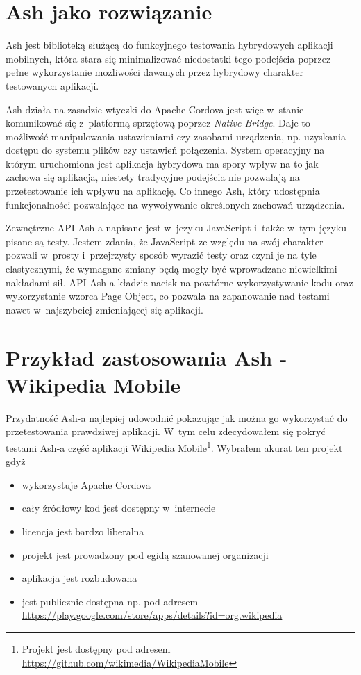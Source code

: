 \documentclass[brudnopis]{xmgr}
\begin{document}
                                                                                                                                                                 
\section{Ash jako rozwiązanie}

Ash jest biblioteką służącą do funkcyjnego testowania hybrydowych aplikacji mobilnych, która stara się minimalizować niedostatki tego podejścia poprzez pełne wykorzystanie możliwości dawanych przez hybrydowy charakter testowanych aplikacji. 

Ash działa na zasadzie wtyczki do Apache Cordova jest więc w~stanie komunikować się z~platformą sprzętową poprzez \textit{Native Bridge}. Daje to możliwość manipulowania ustawieniami czy zasobami urządzenia, np. uzyskania dostępu do systemu plików czy ustawień połączenia. System operacyjny na którym uruchomiona jest aplikacja hybrydowa ma spory wpływ na to jak zachowa się aplikacja, niestety tradycyjne podejścia nie pozwalają na przetestowanie ich wpływu na aplikację. Co innego Ash, który udostępnia funkcjonalności pozwalające na wywoływanie określonych zachowań urządzenia. 

Zewnętrzne API Ash-a napisane jest w~jezyku JavaScript i~także w~tym języku pisane są testy. Jestem zdania, że JavaScript ze względu na swój charakter pozwali w~prosty i~przejrzysty sposób wyrazić testy oraz czyni je na tyle elastycznymi, że wymagane zmiany będą mogły być wprowadzane niewielkimi nakładami sił. API Ash-a kładzie nacisk na powtórne wykorzystywanie kodu oraz wykorzystanie wzorca Page Object, co pozwala na zapanowanie nad testami nawet w~najszybciej zmieniającej się aplikacji. 

\section{Przykład zastosowania Ash - Wikipedia Mobile}

Przydatność Ash-a najlepiej udowodnić pokazując jak można go wykorzystać do przetestowania prawdziwej aplikacji. W~tym celu zdecydowałem się pokryć testami Ash-a część aplikacji Wikipedia Mobile\footnote{Projekt jest dostępny pod adresem \url{https://github.com/wikimedia/WikipediaMobile} }. Wybrałem akurat ten projekt gdyż

\begin{itemize}
  \item wykorzystuje Apache Cordova
  \item cały źródłowy kod jest dostępny w~internecie
  \item licencja jest bardzo liberalna
  \item projekt jest prowadzony pod egidą szanowanej organizacji
  \item aplikacja jest rozbudowana
  \item jest publicznie dostępna np. pod adresem \url{https://play.google.com/store/apps/details?id=org.wikipedia}
\end{itemize}
\end{document}
